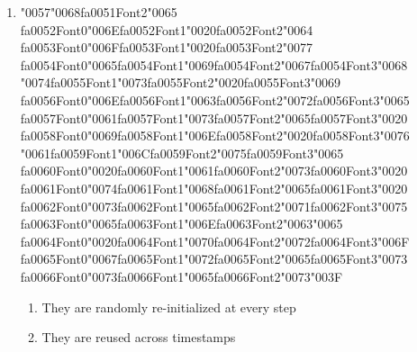 \documentclass[12pt]{article}
\begin{document}
\begin{enumerate}[label=Q\arabic*.]
\item {\char"0057}{\char"0068}{\csname fa0051Font2\endcsname\char"0065} {\csname fa0052Font0\endcsname\char"006E}{\csname fa0052Font1\endcsname\char"0020}{\csname fa0052Font2\endcsname\char"0064} {\csname fa0053Font0\endcsname\char"006F}{\csname fa0053Font1\endcsname\char"0020}{\csname fa0053Font2\endcsname\char"0077} {\csname fa0054Font0\endcsname\char"0065}{\csname fa0054Font1\endcsname\char"0069}{\csname fa0054Font2\endcsname\char"0067}{\csname fa0054Font3\endcsname\char"0068} {\char"0074}{\csname fa0055Font1\endcsname\char"0073}{\csname fa0055Font2\endcsname\char"0020}{\csname fa0055Font3\endcsname\char"0069} {\csname fa0056Font0\endcsname\char"006E}{\csname fa0056Font1\endcsname\char"0063}{\csname fa0056Font2\endcsname\char"0072}{\csname fa0056Font3\endcsname\char"0065} {\csname fa0057Font0\endcsname\char"0061}{\csname fa0057Font1\endcsname\char"0073}{\csname fa0057Font2\endcsname\char"0065}{\csname fa0057Font3\endcsname\char"0020} {\csname fa0058Font0\endcsname\char"0069}{\csname fa0058Font1\endcsname\char"006E}{\csname fa0058Font2\endcsname\char"0020}{\csname fa0058Font3\endcsname\char"0076} {\char"0061}{\csname fa0059Font1\endcsname\char"006C}{\csname fa0059Font2\endcsname\char"0075}{\csname fa0059Font3\endcsname\char"0065} {\csname fa0060Font0\endcsname\char"0020}{\csname fa0060Font1\endcsname\char"0061}{\csname fa0060Font2\endcsname\char"0073}{\csname fa0060Font3\endcsname\char"0020} {\csname fa0061Font0\endcsname\char"0074}{\csname fa0061Font1\endcsname\char"0068}{\csname fa0061Font2\endcsname\char"0065}{\csname fa0061Font3\endcsname\char"0020} {\csname fa0062Font0\endcsname\char"0073}{\csname fa0062Font1\endcsname\char"0065}{\csname fa0062Font2\endcsname\char"0071}{\csname fa0062Font3\endcsname\char"0075} {\csname fa0063Font0\endcsname\char"0065}{\csname fa0063Font1\endcsname\char"006E}{\csname fa0063Font2\endcsname\char"0063}{\char"0065} {\csname fa0064Font0\endcsname\char"0020}{\csname fa0064Font1\endcsname\char"0070}{\csname fa0064Font2\endcsname\char"0072}{\csname fa0064Font3\endcsname\char"006F} {\csname fa0065Font0\endcsname\char"0067}{\csname fa0065Font1\endcsname\char"0072}{\csname fa0065Font2\endcsname\char"0065}{\csname fa0065Font3\endcsname\char"0073} {\csname fa0066Font0\endcsname\char"0073}{\csname fa0066Font1\endcsname\char"0065}{\csname fa0066Font2\endcsname\char"0073}{\char"003F}
\begin{enumerate}[label=(\Alph*)]
    \item They are randomly re-initialized at every step
    \item They are reused across timestamps

\end{enumerate}
\end{enumerate}
\end{document}
